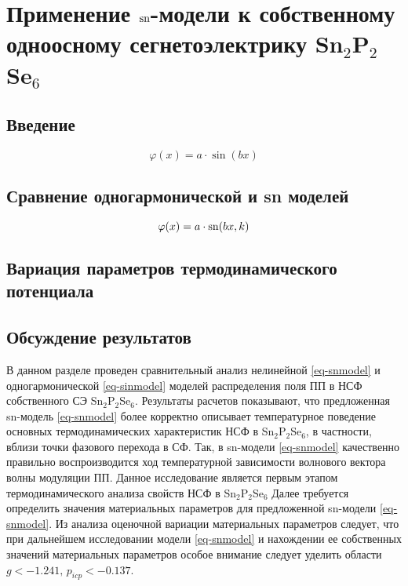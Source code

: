 
\chapter{Применение $\operatorname{sn}$-модели к собственному одноосному сегнетоэлектрику Sn$_2$P$_2$Se$_6$}\label{ch-appl}

\section{Введение}\label{sec-applintro}

\begin{equation}
\varphi(x) = a \cdot \sin(bx)
\label{eq-sinmodel}
\end{equation}

\section{Сравнение одногармонической и sn моделей}\label{sec-compare}

\begin{equation}
\varphi(x) = a \cdot \operatorname{sn}(bx, k)
\label{eq-snmodel}
\end{equation}

\section{Вариация параметров термодинамического потенциала}\label{sec-variate}

\section{Обсуждение результатов}\label{sec-discuss}

В данном разделе проведен сравнительный анализ нелинейной \eqref{eq-snmodel} и одногармонической \eqref{eq-sinmodel} моделей распределения поля ПП в НСФ собственного СЭ Sn$_2$P$_2$Se$_6$. Результаты расчетов показывают, что предложенная sn-модель \eqref{eq-snmodel} более корректно описывает температурное поведение основных термодинамических характеристик НСФ в Sn$_2$P$_2$Se$_6$, в частности, вблизи точки фазового перехода в СФ. Так, в sn-модели \eqref{eq-snmodel} качественно правильно воспроизводится ход температурной зависимости волнового вектора волны модуляции ПП.
Данное исследование является первым этапом термодинамического анализа свойств НСФ в Sn$_2$P$_2$Se$_6$ Далее требуется определить значения материальных параметров для предложенной sn-модели \eqref{eq-snmodel}. Из анализа оценочной вариации материальных параметров следует, что при дальнейшем исследовании модели \eqref{eq-snmodel} и нахождении ее собственных значений материальных параметров особое внимание следует уделить области $g < -1.241,\, p_{icp} < -0.137$.
